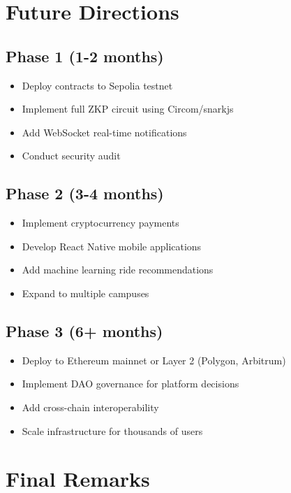 \documentclass[12pt]{report}
\theoremstyle{plain}
\theoremstyle{definition}
\theoremstyle{remark}
\begin{document}
\section{Future Directions}

\subsection{Phase 1 (1-2 months)}

\begin{itemize}
    \item Deploy contracts to Sepolia testnet
    \item Implement full ZKP circuit using Circom/snarkjs
    \item Add WebSocket real-time notifications
    \item Conduct security audit
\end{itemize}

\subsection{Phase 2 (3-4 months)}

\begin{itemize}
    \item Implement cryptocurrency payments
    \item Develop React Native mobile applications
    \item Add machine learning ride recommendations
    \item Expand to multiple campuses
\end{itemize}

\subsection{Phase 3 (6+ months)}

\begin{itemize}
    \item Deploy to Ethereum mainnet or Layer 2 (Polygon, Arbitrum)
    \item Implement DAO governance for platform decisions
    \item Add cross-chain interoperability
    \item Scale infrastructure for thousands of users
\end{itemize}

\section{Final Remarks}
\end{document}
